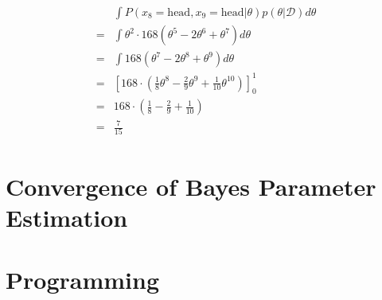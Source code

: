 \documentclass{article}
\begin{document}
\begin{align}
\begin{aligned}
	& \int P(x_8 = \text{head}, x_9 = \text{head} | \theta) p(\theta|\mathcal{D}) d\theta\\
=	& \int \theta^2 \cdot 168(\theta^5 - 2 \theta ^6 + \theta^7) d\theta\\
=	& \int 168(\theta^7 - 2 \theta ^8 + \theta^9) d\theta\\
=	& \left[ 168 \cdot(\frac{1}{8}\theta^8 - \frac{2}{9} \theta ^9 + \frac{1}{10}\theta^{10}) \right]_0^1\\
=	& 168 \cdot (\frac{1}{8} - \frac{2}{9} + \frac{1}{10})\\
=	& \frac{7}{15}
\end{aligned}
\end{align}


\section{Convergence of Bayes Parameter Estimation}


\section{Programming}


%

%

\end{document}
